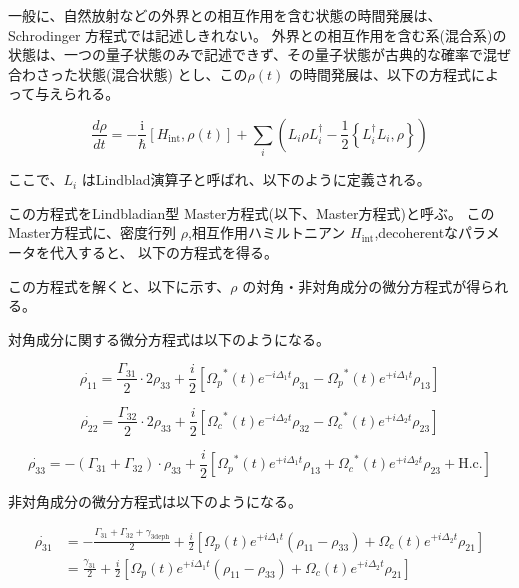 \documentclass[11pt,a4paper]{ltjsarticle}
\begin{document}
一般に、自然放射などの外界との相互作用を含む状態の時間発展は、Schrodinger 方程式では記述しきれない。
外界との相互作用を含む系(混合系)の状態は、一つの量子状態のみで記述できず、その量子状態が古典的な確率で混ぜ合わさった状態(混合状態)
とし、この$\rho(t)$ の時間発展は、以下の方程式によって与えられる。


\begin{equation*}
  \frac{d \rho}{d t} = -\frac{\mathrm{i}}{\hbar} \left[ H_{\mathrm{int}}, \rho(t) \right] + \sum_{i} \left( L_{i} \rho L_{i}^{\dag} - \frac{1}{2} \left\{ L_{i}^{\dag} L_{i}, \rho \right\} \right)
\end{equation*}


ここで、$L_{i}$ はLindblad演算子と呼ばれ、以下のように定義される。

この方程式をLindbladian型 Master方程式(以下、Master方程式)と呼ぶ。
このMaster方程式に、密度行列 $\rho$,相互作用ハミルトニアン $H_{ \mathrm{int}}$,decoherentなパラメータを代入すると、
以下の方程式を得る。



この方程式を解くと、以下に示す、$\rho$ の対角・非対角成分の微分方程式が得られる。

対角成分に関する微分方程式は以下のようになる。


\begin{equation*}
  \dot{ \rho_{11} } = \frac{ \Gamma_{31} }{2} \cdot 2 \rho_{33} + \frac{i}{2} \left[ {\Omega_{p}}^*(t) e^{-i \Delta_1 t} \rho_{31} - {\Omega_{p}}^*(t) e^{+i \Delta_1 t} \rho_{13} \right] 
\end{equation*}

\begin{equation*}
  \dot{ \rho_{22} } = \frac{ \Gamma_{32} }{2} \cdot 2 \rho_{33} + \frac{i}{2} \left[ {\Omega_{c}}^*(t) e^{-i \Delta_2 t} \rho_{32} - {\Omega_{c}}^*(t) e^{+i \Delta_2 t} \rho_{23} \right] 
\end{equation*}

\begin{equation*}
  \dot{ \rho_{33} } = - \left( \Gamma_{31} + \Gamma_{32} \right) \cdot \rho_{33} + \frac{i}{2} \left[ {\Omega_{p}}^*(t) e^{+i \Delta_1 t} \rho_{13} + {\Omega_{c}}^*(t) e^{+i \Delta_2 t} \rho_{23} + \mathrm{H.c.} \right]
\end{equation*}

非対角成分の微分方程式は以下のようになる。

\begin{align*}
  \dot{ \rho_{31} } &= - \frac{ \Gamma_{31} + \Gamma_{32} + \gamma_{3 \mathrm{deph}} }{2} 
                                                                           + \frac{i}{2} \left[\Omega_{p}(t) e^{+i \Delta_1 t} (\rho_{11} - \rho_{33}) +  \Omega_{c}(t) e^{+i \Delta_2 t} \rho_{21} \right]\\
                    &= \frac{ \gamma_{31}}{2}
                                                                          + \frac{i}{2} \left[\Omega_{p}(t) e^{+i \Delta_1 t} (\rho_{11} - \rho_{33}) +  \Omega_{c}(t) e^{+i \Delta_2 t} \rho_{21} \right]
\end{align*}
\end{document}
